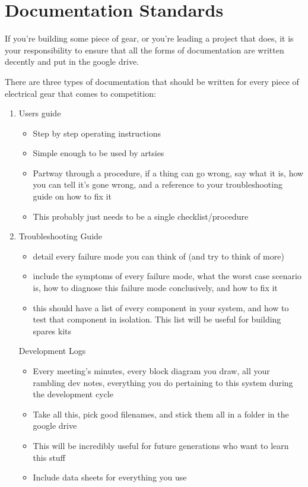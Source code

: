 \documentclass{article}
\begin{document}
\section{Documentation Standards}
If you're building some piece of gear, or you're leading a project that does, it is your responsibility to ensure that all the forms of documentation are written decently and put in the google drive.

There are three types of documentation that should be written for every piece of electrical gear that comes to competition:

\begin{enumerate}
\item Users guide
\begin{itemize}
\item Step by step operating instructions
\item Simple enough to be used by artsies
\item Partway through a procedure, if a thing can go wrong, say what it is, how you can tell it's gone wrong, and a reference to your troubleshooting guide on how to fix it
\item This probably just needs to be a single checklist/procedure
\end{itemize}
\item Troubleshooting Guide
\begin{itemize}
\item detail every failure mode you can think of (and try to think of more)
\item include the symptoms of every failure mode, what the worst case scenario is, how to diagnose this failure mode conclusively, and how to fix it
\item this should have a list of every component in your system, and how to test that component in isolation. This list will be useful for building spares kits
\end{itemize}
Development Logs
\begin{itemize}
\item Every meeting's minutes, every block diagram you draw, all your rambling dev notes, everything you do pertaining to this system during the development cycle
\item Take all this, pick good filenames, and stick them all in a folder in the google drive
\item This will be incredibly useful for future generations who want to learn this stuff
\item Include data sheets for everything you use
\end{itemize}
\end{enumerate}
\end{document}
